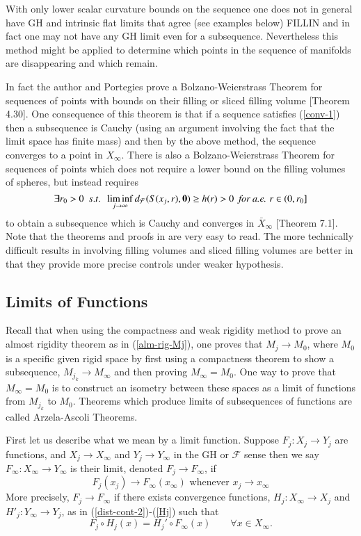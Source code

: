 \documentclass[12pt]{amsart}
\begin{document}
With only lower scalar curvature bounds on the sequence one does not
in general have GH and intrinsic flat limits that agree (see examples
below) FILLIN and in fact one may not have any GH limit even for a
subsequence.   Nevertheless this method might be applied to determine
which points in the sequence of manifolds are disappearing and which
remain.   

In fact the author and Portegies prove a Bolzano-Weierstrass
Theorem for sequences of points with bounds on their filling or sliced filling volume
\cite{Sormani-properties}[Theorem 4.30].  One consequence of this
theorem is that if
a sequence satisfies (\ref{conv-1}) then a subsequence is Cauchy 
(using an argument involving the fact that the limit space has finite mass) 
and then by the above method, the sequence converges to a point in $X_\infty$.
There is also a Bolzano-Weierstrass Theorem for sequences of points 
which does not require a lower bound on the filling
volumes of spheres, but instead requires
\begin{equation}
\exists r_0>0 \,\,\,s.t.\,\,\,
\liminf_{j\to\infty} d_{\mathcal{F}}(S(x_j,r), {\bf{0}}) \ge h(r)>0
\,\,\,\textrm{\em for a.e. } r\in (0, r_0]
\end{equation}
to obtain a subsequence which is Cauchy and converges 
in $\bar{X}_\infty$ \cite{Sormani-AA}[Theorem 7.1].   Note that the 
theorems and proofs in \cite{Sormani-AA} are very easy to read.
The more technically difficult results in \cite{Sormani-properties} involving
filling volumes and sliced filling volumes are better in that they
provide more precise controls under weaker hypothesis.

\subsection{Limits of Functions}

Recall that when using the compactness and weak rigidity method to prove an almost rigidity theorem as in (\ref{alm-rig-Mj}), one proves that
$M_j \to M_0$, where $M_0$ is a specific given rigid space by first using a compactness theorem to show a subsequence, $M_{j_k} \to M_\infty$ and then proving $M_\infty=M_0$.   One way to prove that $M_\infty=M_0$ is to
construct an isometry between these spaces as a limit of functions from
$M_{j_k}$ to $M_0$. Theorems which produce limits of subsequences of 
functions are called Arzela-Ascoli Theorems. 

First let us describe what we mean by a limit function.  
Suppose $F_j : X_j \to Y_j$ are functions, and $X_j \to X_\infty$ and 
$Y_j \to Y_\infty$ in the GH or $\mathcal{F}$ sense then we say
$F_\infty: X_\infty\to Y_\infty$ is their limit, denoted
$F_j \to F_\infty$, if 
\begin{equation}
F_j(x_j) \to F_\infty(x_\infty) \textrm{ whenever } x_j \to x_\infty
\end{equation}
More precisely, $F_j \to F_\infty$ if there exists
convergence functions, $H_j: X_\infty \to X_j$ and $H'_j: Y_\infty\to Y_j$, 
as in (\ref{dist-cont-2})-(\ref{Hj}) such that
\begin{equation}
F_j\circ H_j(x) = H_j' \circ F_\infty(x) \qquad \forall x \in X_\infty.  
\end{equation}
\end{document}
